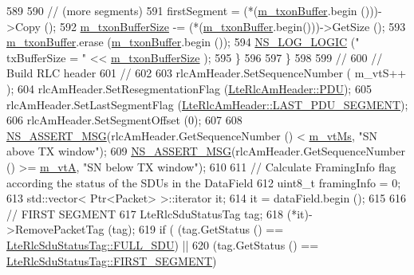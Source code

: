 \begin{DoxyCode}
589 
590           \textcolor{comment}{// (more segments)}
591           firstSegment = (*(\hyperlink{classns3_1_1LteRlcAm_ad8ba4549a7c78cfe0e528d2e9cc465f8}{m\_txonBuffer}.begin ()))->Copy ();
592           \hyperlink{classns3_1_1LteRlcAm_a3e8db6b5bc1d3fcc215d554e8d347eda}{m\_txonBufferSize} -= (*(\hyperlink{classns3_1_1LteRlcAm_ad8ba4549a7c78cfe0e528d2e9cc465f8}{m\_txonBuffer}.begin()))->GetSize ();
593           \hyperlink{classns3_1_1LteRlcAm_ad8ba4549a7c78cfe0e528d2e9cc465f8}{m\_txonBuffer}.erase (\hyperlink{classns3_1_1LteRlcAm_ad8ba4549a7c78cfe0e528d2e9cc465f8}{m\_txonBuffer}.begin ());
594           \hyperlink{group__logging_ga88acd260151caf2db9c0fc84997f45ce}{NS\_LOG\_LOGIC} (\textcolor{stringliteral}{"        txBufferSize = "} << 
      \hyperlink{classns3_1_1LteRlcAm_a3e8db6b5bc1d3fcc215d554e8d347eda}{m\_txonBufferSize} );
595         \}
596 
597     \}
598 
599   \textcolor{comment}{//}
600   \textcolor{comment}{// Build RLC header}
601   \textcolor{comment}{//}
602 
603   rlcAmHeader.SetSequenceNumber ( m\_vtS++ );
604   rlcAmHeader.SetResegmentationFlag (\hyperlink{classns3_1_1LteRlcAmHeader_aa7a03eaac5875a18c2f95d3a0091d138a6f96f786048a3d5e5189aba4e21f5d22}{LteRlcAmHeader::PDU});
605   rlcAmHeader.SetLastSegmentFlag (\hyperlink{classns3_1_1LteRlcAmHeader_a02bef898cceaabdd21d7b93ef77c727ba99aff9b2f33113b920f64b4dce7af643}{LteRlcAmHeader::LAST\_PDU\_SEGMENT});
606   rlcAmHeader.SetSegmentOffset (0);
607 
608   \hyperlink{assert_8h_aff5ece9066c74e681e74999856f08539}{NS\_ASSERT\_MSG}(rlcAmHeader.GetSequenceNumber () < \hyperlink{classns3_1_1LteRlcAm_a5fcf0776ed7e13952945d41e4b3622c7}{m\_vtMs}, \textcolor{stringliteral}{"SN above TX window"});
609   \hyperlink{assert_8h_aff5ece9066c74e681e74999856f08539}{NS\_ASSERT\_MSG}(rlcAmHeader.GetSequenceNumber () >= \hyperlink{classns3_1_1LteRlcAm_a55514b9f03d8f70cdbb8cdac053f39b5}{m\_vtA}, \textcolor{stringliteral}{"SN below TX window"});
610 
611   \textcolor{comment}{// Calculate FramingInfo flag according the status of the SDUs in the DataField}
612   uint8\_t framingInfo = 0;
613   std::vector< Ptr<Packet> >::iterator it;
614   it = dataField.begin ();
615 
616   \textcolor{comment}{// FIRST SEGMENT}
617   LteRlcSduStatusTag tag;
618   (*it)->RemovePacketTag (tag);
619   \textcolor{keywordflow}{if} ( (tag.GetStatus () == \hyperlink{classns3_1_1LteRlcSduStatusTag_ae7822c5cc0d54a3d193b09a91ed6f133ade41b0025c66cd211e992196f314d4a5}{LteRlcSduStatusTag::FULL\_SDU}) ||
620        (tag.GetStatus () == \hyperlink{classns3_1_1LteRlcSduStatusTag_ae7822c5cc0d54a3d193b09a91ed6f133afda65e6233ba6fd1cd8aacf54cd11269}{LteRlcSduStatusTag::FIRST\_SEGMENT})

\end{DoxyCode}

